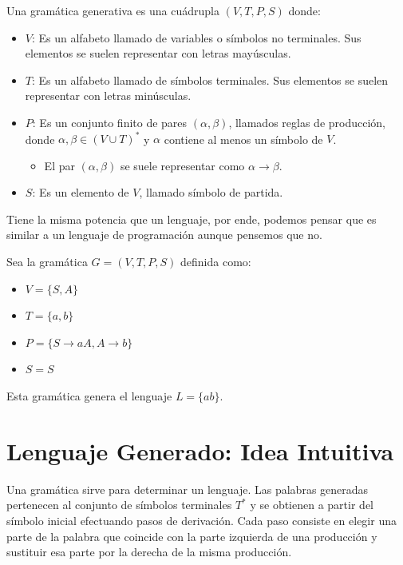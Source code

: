 \documentclass[12pt]{report} %
\begin{document}
\begin{definicion}
Una gramática generativa es una cuádrupla $(V, T, P, S)$ donde:

\begin{itemize}
    \item \textbf{$V$}: Es un alfabeto llamado de variables o símbolos no terminales. Sus elementos se suelen representar con letras mayúsculas.
    \item \textbf{$T$}: Es un alfabeto llamado de símbolos terminales. Sus elementos se suelen representar con letras minúsculas.
    \item \textbf{$P$}: Es un conjunto finito de pares $(\alpha, \beta)$, llamados reglas de producción, donde $\alpha, \beta \in (V \cup T)^*$ y $\alpha$ contiene al menos un símbolo de $V$.
        \begin{itemize}
            \item El par $(\alpha, \beta)$ se suele representar como $\alpha \to \beta$.
        \end{itemize}
    \item \textbf{$S$}: Es un elemento de $V$, llamado símbolo de partida.
\end{itemize}
\end{definicion}

Tiene la misma potencia que un lenguaje, por ende, podemos pensar que es
similar a un lenguaje de programación aunque pensemos que no.

\begin{ejemplo}
Sea la gramática $G = (V, T, P, S)$ definida como:  
    \begin{itemize}
        \item $V = \{S, A\}$  
        \item $T = \{a, b\}$  
        \item $P = \{S \to aA, A \to b\}$  
        \item $S = S$  
    \end{itemize}
\end{ejemplo}

Esta gramática genera el lenguaje \(L = \{ab\}\).

\hypertarget{lenguaje-generado-idea-intuitiva}{%
\section{Lenguaje Generado: Idea
Intuitiva}\label{lenguaje-generado-idea-intuitiva}}

Una gramática sirve para determinar un lenguaje. Las palabras generadas
pertenecen al conjunto de símbolos terminales \(T^*\) y se obtienen a
partir del símbolo inicial efectuando pasos de derivación. Cada paso
consiste en elegir una parte de la palabra que coincide con la parte
izquierda de una producción y sustituir esa parte por la derecha de la
misma producción.
\end{document}
